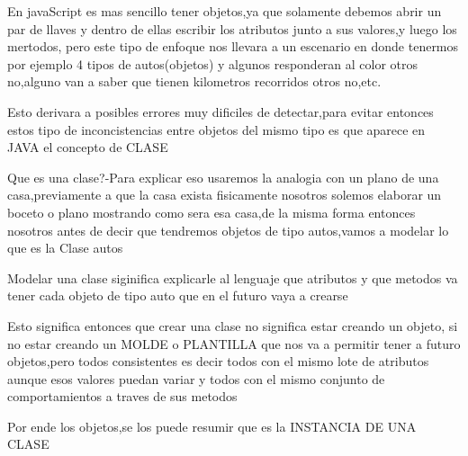 En javaScript es mas sencillo tener objetos,ya que solamente debemos abrir un par de llaves y dentro de ellas escribir los atributos junto a sus valores,y luego los mertodos,
pero este tipo de enfoque nos llevara a un escenario en donde tenermos por ejemplo 4 tipos de autos(objetos) y algunos responderan al color otros no,alguno van a saber que tienen
kilometros recorridos otros no,etc.

Esto derivara a posibles errores muy dificiles de detectar,para evitar entonces estos tipo de inconcistencias entre objetos del mismo tipo es que aparece en JAVA el concepto de CLASE


Que es una clase?-Para explicar eso usaremos la analogia con un plano de una casa,previamente a que la casa exista fisicamente nosotros solemos elaborar un boceto o plano mostrando como
sera esa casa,de la misma forma entonces nosotros antes de decir que tendremos objetos de tipo autos,vamos a modelar lo que es la Clase autos

Modelar una clase siginifica explicarle al lenguaje  que atributos y que metodos va tener cada objeto de tipo auto que en el futuro vaya a crearse

Esto significa entonces que crear una clase no significa estar creando un objeto, si no estar creando un MOLDE o PLANTILLA que nos va a permitir tener a futuro objetos,pero todos consistentes 
es decir todos con el mismo lote de atributos aunque esos valores puedan variar y todos con el mismo conjunto de comportamientos a traves de sus metodos

Por ende los objetos,se los puede resumir que es la INSTANCIA DE UNA CLASE 